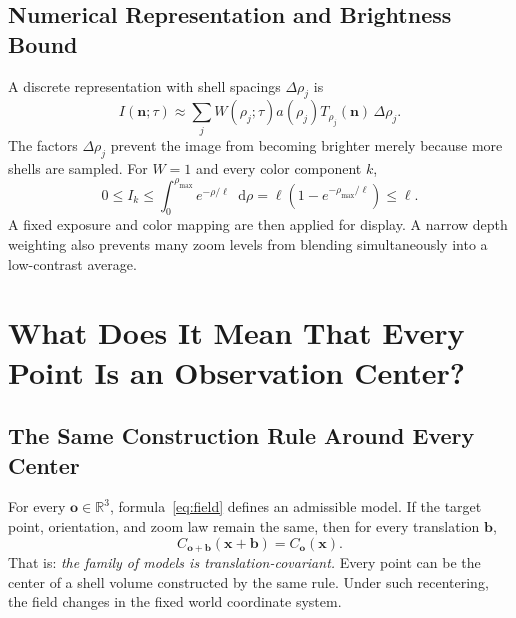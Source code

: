 \documentclass[11pt,a4paper]{article}
\numberwithin{equation}{section}
\newcommand{\R}{\mathbb R}
\newcommand{\vct}[1]{\boldsymbol{#1}}
\newcommand{\dd}{\mathop{}\!\mathrm d}
\begin{document}
\subsection{Numerical Representation and Brightness Bound}
A discrete representation with shell spacings $\Delta\rho_j$ is
\begin{equation}
 I(\vct n;\tau)\approx\sum_j
 W(\rho_j;\tau)a(\rho_j)T_{\rho_j}(\vct n)\,\Delta\rho_j.
\end{equation}
The factors $\Delta\rho_j$ prevent the image from becoming brighter merely because
more shells are sampled. For $W=1$ and every color component $k$,
\[
 0\le I_k\le\int_0^{\rho_{\max}}e^{-\rho/\ell}\dd\rho
 =\ell(1-e^{-\rho_{\max}/\ell})\le\ell.
\]
A fixed exposure and color mapping are then applied for display. A narrow depth
weighting also prevents many zoom levels from blending simultaneously into a
low-contrast average.

\newpage
\section{What Does It Mean That Every Point Is an Observation Center?}
\subsection{The Same Construction Rule Around Every Center}
For every $\vct o\in\R^3$, formula~\eqref{eq:field} defines an admissible model.
If the target point, orientation, and zoom law remain the same, then for every
translation $\vct b$,
\begin{equation}\label{eq:covariance}
 C_{\vct o+\vct b}(\vct x+\vct b)=C_{\vct o}(\vct x).
\end{equation}
That is: \emph{the family of models is translation-covariant.}
Every point can be the center of a shell volume constructed by the same rule.
Under such recentering, the field changes in the fixed world coordinate system.
\end{document}

